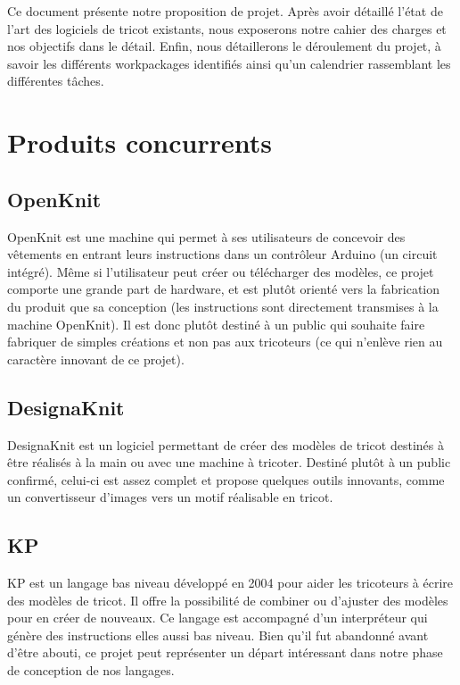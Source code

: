 \documentclass{article}
\begin{document}
Ce document présente notre proposition de projet. Après avoir détaillé l'état de l'art des logiciels de tricot existants, nous exposerons
notre cahier des charges et nos objectifs dans le détail. Enfin, nous détaillerons le déroulement du projet, à savoir les différents
workpackages identifiés ainsi qu'un calendrier rassemblant les différentes tâches.


\section{Produits concurrents}



\subsection{OpenKnit}

OpenKnit est une machine qui permet à ses utilisateurs de concevoir des vêtements en entrant leurs instructions dans un contrôleur Arduino
(un circuit intégré). Même si l'utilisateur peut créer ou télécharger des modèles, ce projet comporte une grande part de hardware, et est
plutôt orienté vers la fabrication du produit que sa conception (les instructions sont directement transmises à la machine OpenKnit). Il
est donc plutôt destiné à un public qui souhaite faire fabriquer de simples créations et non pas aux tricoteurs (ce qui n'enlève rien au
caractère innovant de ce projet).

\subsection{DesignaKnit}

DesignaKnit est un logiciel permettant de créer des modèles de tricot destinés à être réalisés à la main ou avec une machine à tricoter.
Destiné plutôt à un public confirmé, celui-ci est assez complet et propose quelques outils innovants, comme un convertisseur d'images vers 
un motif réalisable en tricot.

\subsection{KP}

KP est un langage bas niveau développé en 2004 pour aider les tricoteurs à écrire des modèles de tricot. Il offre la possibilité de
combiner ou d'ajuster des modèles pour en créer de nouveaux. Ce langage est accompagné d'un interpréteur qui génère des instructions elles
aussi bas niveau. Bien qu'il fut abandonné avant d'être abouti, ce projet peut représenter un départ intéressant dans notre phase de 
conception de nos langages.
\end{document}
